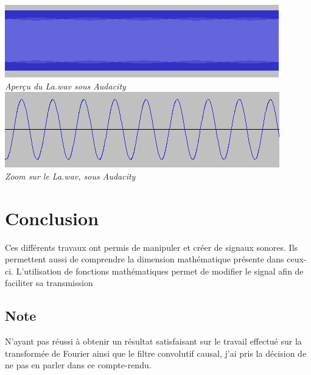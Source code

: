 \documentclass[a4paper,11pt]{article}
\begin{document}
\begin{center}
\includegraphics[scale=1]{zoom3.png}\\
\textit{Aperçu du La.wav sous Audacity}
\includegraphics[scale=1]{zoom4.png}\\
\textit{Zoom sur le La.wav, sous Audacity}
\end{center}
\newpage 
\section*{Conclusion}
Ces différents travaux ont permis de manipuler et créer de signaux sonores. Ils permettent aussi de comprendre la dimension mathématique présente dans ceux-ci. L'utilisation de fonctions mathématiques permet de modifier le signal afin de faciliter sa transmission
\bigskip
\bigskip
\bigskip
\bigskip
\bigskip
\bigskip
\subsection*{Note}
N'ayant pas réussi à obtenir un résultat satisfaisant sur le travail effectué sur la transformée de Fourier ainsi que le filtre convolutif causal, j'ai pris la décision de ne pas en parler dans ce compte-rendu.
\end{document}
